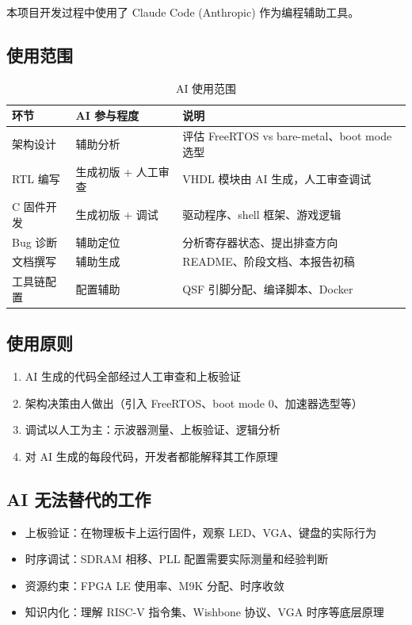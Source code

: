 \documentclass{SYSUReport}
\begin{document}
本项目开发过程中使用了 Claude Code (Anthropic) 作为编程辅助工具。

\subsection{使用范围}

\begin{table}[!htbp]
    \centering
    \small
    \begin{tabular}{l|l|l}
        \hline
        \textbf{环节} & \textbf{AI 参与程度} & \textbf{说明} \\
        \hline
        架构设计 & 辅助分析 & 评估 FreeRTOS vs bare-metal、boot mode 选型 \\
        RTL 编写 & 生成初版 + 人工审查 & VHDL 模块由 AI 生成，人工审查调试 \\
        C 固件开发 & 生成初版 + 调试 & 驱动程序、shell 框架、游戏逻辑 \\
        Bug 诊断 & 辅助定位 & 分析寄存器状态、提出排查方向 \\
        文档撰写 & 辅助生成 & README、阶段文档、本报告初稿 \\
        工具链配置 & 配置辅助 & QSF 引脚分配、编译脚本、Docker \\
        \hline
    \end{tabular}
    \caption{AI 使用范围}
\end{table}

\subsection{使用原则}

\begin{enumerate}
    \item AI 生成的代码全部经过人工审查和上板验证
    \item 架构决策由人做出（引入 FreeRTOS、boot mode 0、加速器选型等）
    \item 调试以人工为主：示波器测量、上板验证、逻辑分析
    \item 对 AI 生成的每段代码，开发者都能解释其工作原理
\end{enumerate}

\subsection{AI 无法替代的工作}

\begin{itemize}
    \item 上板验证：在物理板卡上运行固件，观察 LED、VGA、键盘的实际行为
    \item 时序调试：SDRAM 相移、PLL 配置需要实际测量和经验判断
    \item 资源约束：FPGA LE 使用率、M9K 分配、时序收敛
    \item 知识内化：理解 RISC-V 指令集、Wishbone 协议、VGA 时序等底层原理
\end{itemize}
\end{document}
